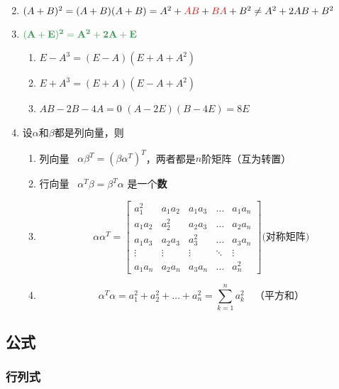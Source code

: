 \documentclass[a4paper,12pt]{article}
\begin{document}
\begin{enumerate}
\[        \]
        \item $(A + B)^2 = (A + B)(A + B) = A^2 + {\color{red}{AB}} + {\color{red}{BA}} + B^2 \;\mathbf{\neq}\; A^2 + 2AB + B^2$
        \item $\color[rgb]{0.2, 0.6, 0.3}{\mathbf{(A + E)^2 = A^2 + 2A + E}}$
        \begin{enumerate}
            \item $E - A^3 = (E - A)(E + A + A^2)$
            \item $E + A^3 = (E + A)(E - A + A^2)$
            \item $AB - 2B - 4A = 0$ \Leftrightarrow $(A - 2E)(B - 4E) = 8E$
        \end{enumerate}
        \item 设$\alpha$和$\beta$都是列向量，则
        \begin{enumerate}
            \item 列向量 \cdot {} \, $\alpha\beta^T = (\beta\alpha^T)^T$，两者都是$n$阶矩阵（互为转置）
            \item 行向量 \cdot {} \, $\alpha^T\beta = \beta^T\alpha$ 是一个\textbf{数}
            \item
            \[
                \alpha\alpha^T =
                \begin{bmatrix}
                    a_1^2   & a_1 a_2 & a_1 a_3 & \dots  & a_1 a_n \\
                    a_1 a_2 & a_2^2   & a_2 a_3 & \dots  & a_2 a_n \\
                    a_1 a_3 & a_2 a_3 & a_3^2   & \dots  & a_3 a_n \\
                    \vdots  & \vdots  & \vdots  & \ddots & \vdots  \\
                    a_1 a_n & a_2 a_n & a_3 a_n & \dots  & a_n^2
                \end{bmatrix} \text{(对称矩阵)}
            \]
            \item
            \[
                \alpha^T \alpha = a_1^2 + a_2^2 + \dots + a_n^2 = \sum_{k=1}^{n} a_k^2 \quad \text{（平方和）}
            \]
        \end{enumerate}
    \end{enumerate}

    \subsection{公式}

    \subsubsection{行列式}
\end{document}

